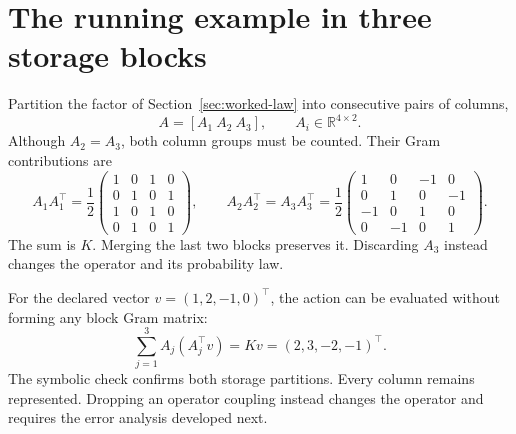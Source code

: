\section{The running example in three storage blocks}\label{sec:worked-stream}
Partition the factor of Section~\ref{sec:worked-law} into consecutive pairs of columns,
\[
A=[A_1\ A_2\ A_3],\qquad A_i\in\mathbb R^{4\times2}.
\]
Although $A_2=A_3$, both column groups must be counted. Their Gram contributions are
\[
A_1A_1^\top=\frac12
\begin{pmatrix}1&0&1&0\\0&1&0&1\\1&0&1&0\\0&1&0&1\end{pmatrix},\qquad
A_2A_2^\top=A_3A_3^\top=\frac12
\begin{pmatrix}1&0&-1&0\\0&1&0&-1\\-1&0&1&0\\0&-1&0&1\end{pmatrix}.
\]
The sum is $K$. Merging the last two blocks preserves it. Discarding $A_3$ instead changes the operator and its probability law.

For the declared vector $v=(1,2,-1,0)^\top$, the action can be evaluated without forming any block Gram matrix:
\[
\sum_{j=1}^3 A_j(A_j^\top v)=Kv=(2,3,-2,-1)^\top.
\]
The symbolic check confirms both storage partitions. Every column remains represented. Dropping an operator coupling instead changes the operator and requires the error analysis developed next.
